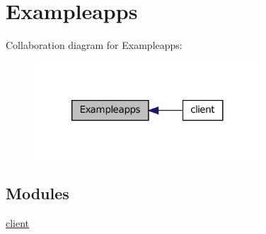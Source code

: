 \hypertarget{group__exampleapps}{
\section{Exampleapps}
\label{group__exampleapps}
}


Collaboration diagram for Exampleapps:
\nopagebreak
\begin{figure}[H]
\begin{center}
\leavevmode
\includegraphics[width=240pt]{group__exampleapps}
\end{center}
\end{figure}


\subsection*{Modules}
\begin{DoxyCompactItemize}
\item 
\hyperlink{group__ftp}{client}
\end{DoxyCompactItemize}
